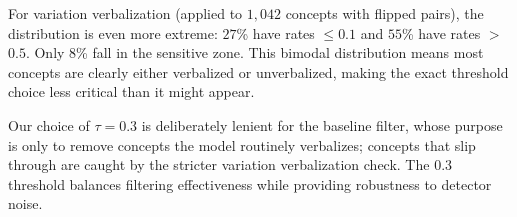 For variation verbalization (applied to $1{,}042$ concepts with flipped pairs), the distribution is even more extreme: $27$\% have rates $\leq$$0.1$ and $55$\% have rates $>$$0.5$. Only $8$\% fall in the sensitive zone. This bimodal distribution means most concepts are clearly either verbalized or unverbalized, making the exact threshold choice less critical than it might appear.

Our choice of $\tau = 0.3$ is deliberately lenient for the baseline filter, whose purpose is only to remove concepts the model routinely verbalizes; concepts that slip through are caught by the stricter variation verbalization check. The 0.3 threshold balances filtering effectiveness while providing robustness to detector noise.
